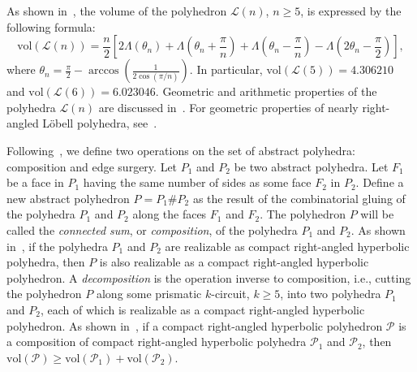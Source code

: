 \documentclass{amsart}
\newcommand{\vol}{\mathrm{vol}}
\begin{document}
As shown in~\cite{Ves98}, the volume of the polyhedron $\mathcal L(n)$, $n \geq 5$, is expressed by the following formula:
\begin{equation} \label{eqn5}
\vol(\mathcal L(n)) = \frac{n}{2} \left[ 2 \Lambda(\theta_n) + \Lambda\left( \theta_n + \frac{\pi}{n} \right) + \Lambda \left( \theta_n - \frac{\pi}{n} \right) - \Lambda\left( 2 \theta_n - \frac{\pi}{2} \right) \right], 
\end{equation} 
where $\theta_n = \frac{\pi}{2} - \arccos \left( \frac{1}{2\cos(\pi/n)} \right)$. In particular, $\vol(\mathcal L(5)) = 4.306210$ and $\vol(\mathcal L(6)) = 6.023046$. Geometric and arithmetic properties of the polyhedra $\mathcal L(n)$ are discussed in~\cite{BoDo}. For geometric properties of nearly right-angled L\"obell polyhedra, see~\cite{BuMeVe}.

Following~\cite{In08}, we define two operations on the set of abstract polyhedra: composition and edge surgery. Let $P_1$ and $P_2$ be two abstract polyhedra. Let $F_1$ be a face in $P_1$ having the same number of sides as some face $F_2$ in $P_2$. Define a new abstract polyhedron $P = P_1 \# P_2$ as the result of the combinatorial gluing of the polyhedra $P_1$ and $P_2$ along the faces $F_1$ and $F_2$. The polyhedron $P$ will be called the \textit{connected sum}, or \textit{composition}, of the polyhedra $P_1$ and $P_2$. As shown in~\cite[Th.~4.4]{In08}, if the polyhedra $P_1$ and $P_2$ are realizable as compact right-angled hyperbolic polyhedra, then $P$ is also realizable as a compact right-angled hyperbolic polyhedron.
A \textit{decomposition} is the operation inverse to composition, i.e., cutting the polyhedron $P$ along some prismatic $k$-circuit, $k \geq 5$, into two polyhedra $P_1$ and $P_2$, each of which is realizable as a compact right-angled hyperbolic polyhedron. As shown in~\cite[Th.~6.4]{In08}, if a compact right-angled hyperbolic polyhedron $\mathcal P$ is a composition of compact right-angled hyperbolic polyhedra $\mathcal P_1$ and $\mathcal P_2$, then $\vol(\mathcal P) \geq \vol(\mathcal P_1) + \vol(\mathcal P_2)$.
\end{document}
